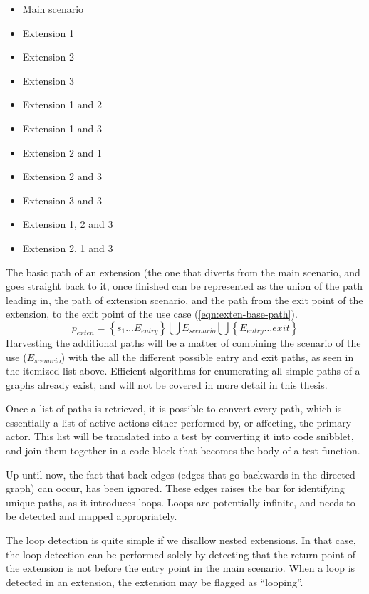 \begin{itemize}
  \item Main scenario
  \item Extension 1
  \item Extension 2
  \item Extension 3
  \item Extension 1 and 2
  \item Extension 1 and 3  
  \item Extension 2 and 1
  \item Extension 2 and 3  
  \item Extension 3 and 3
  \item Extension 1, 2 and 3
  \item Extension 2, 1 and 3
\end{itemize}
\noindent The basic path of an extension (the one that diverts from the main scenario, and goes straight back to it, once finished can be represented as the union of the path leading in, the path of extension scenario, and the path from the exit point of the extension, to the exit point of the use case (\ref{eqn:exten-base-path}). 
\begin{equation}
p_{exten} = \left\lbrace s_1 \dots E_{entry} \right\rbrace \bigcup E_{scenario} \bigcup \left\lbrace E_{entry} \dots exit \right\rbrace
\label{eqn:exten-base-path}
\end{equation}
\noindent Harvesting the additional paths will be a matter of combining the scenario of the use ($E_{scenario}$) with the all the different possible entry and exit paths, as seen in the itemized list above. Efficient algorithms for enumerating all simple paths of a graphs already exist\cite{rubin1978enumerating}, and will not be covered in more detail in this thesis.\medskip

\noindent Once a list of paths is retrieved, it is possible to convert every path, which is essentially a list of active actions either performed by, or affecting, the primary actor. This list will be translated into a test by converting it into code snibblet, and join them together in a code block that becomes the body of a test function.\medskip

\noindent Up until now, the fact that back edges (edges that go backwards in the directed graph) can occur, has been ignored. These edges raises the bar for identifying unique paths, as it introduces loops. Loops are potentially infinite, and needs to be detected and mapped appropriately.\medskip

\noindent The loop detection is quite simple if we disallow nested extensions. In that case, the loop detection can be performed solely by detecting that the return point of the extension is not before the entry point in the main scenario. When a loop is detected in an extension, the extension may be flagged as ``looping''.\medskip

